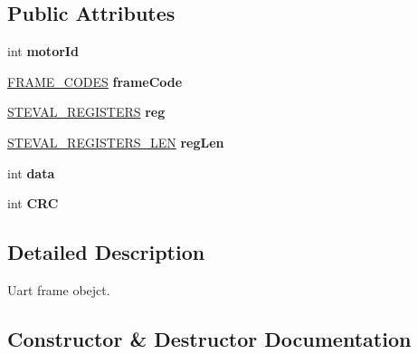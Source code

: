 \subsection*{Public Attributes}
\begin{DoxyCompactItemize}
\item 
\mbox{\label{structFrame_a5ed5915a665d730ae48197fcc13ed6e2}} 
int {\bfseries motor\+Id}
\item 
\mbox{\label{structFrame_a7df21ac765f283dbbdeff0f6b138dbbf}} 
\hyperlink{registers_8h_a9360bf1cda059a1f526e614bdc708067}{F\+R\+A\+M\+E\+\_\+\+C\+O\+D\+ES} {\bfseries frame\+Code}
\item 
\mbox{\label{structFrame_afdea1e81b961af0a76c77feb1b1f6c62}} 
\hyperlink{registers_8h_a1a02f5486dc2072d20b8c0efc8d66780}{S\+T\+E\+V\+A\+L\+\_\+\+R\+E\+G\+I\+S\+T\+E\+RS} {\bfseries reg}
\item 
\mbox{\label{structFrame_abc8ea8dca964e65eb2ff5576d4ea292b}} 
\hyperlink{registers_8h_a420772e8eb2fd0b2ef06da094afb6f59}{S\+T\+E\+V\+A\+L\+\_\+\+R\+E\+G\+I\+S\+T\+E\+R\+S\+\_\+\+L\+EN} {\bfseries reg\+Len}
\item 
\mbox{\label{structFrame_a3a7eb2fd235695c3dbacea750f78fc97}} 
int {\bfseries data}
\item 
\mbox{\label{structFrame_a7111131da675b6ef44494c1a221b8337}} 
int {\bfseries C\+RC}
\end{DoxyCompactItemize}


\subsection{Detailed Description}
Uart frame obejct. 

\subsection{Constructor \& Destructor Documentation}
\mbox{\label{structFrame_aa3e7c6b3f70eb267395ec98251914bd0}} 
